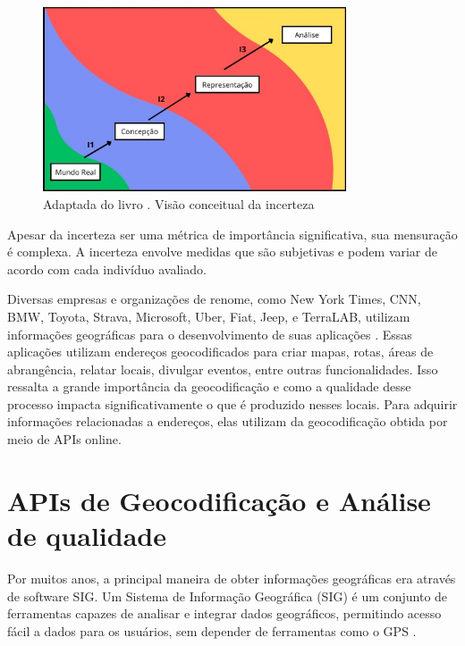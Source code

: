 \begin{figure}[ht]
   \centering
   \includegraphics[width=0.8\textwidth]{Figuras/incertezaMeu.jpeg}
   \caption{Adaptada do livro \cite{longley2013}. Visão conceitual da incerteza}
   \label{fig:incerteza}
\end{figure}

Apesar da incerteza ser uma métrica de importância significativa, sua mensuração é complexa. A incerteza envolve medidas que são subjetivas e podem variar de acordo com cada indivíduo avaliado. 


Diversas empresas e organizações de renome, como New York Times, CNN, BMW, Toyota, Strava, Microsoft, Uber, Fiat, Jeep, e TerraLAB,  utilizam informações geográficas para o desenvolvimento de suas aplicações \cite{ors, terralab, mapbox, tomtom}. Essas aplicações utilizam endereços geocodificados para criar mapas, rotas, áreas de abrangência, relatar locais, divulgar eventos, entre outras funcionalidades. Isso ressalta a grande importância da geocodificação e como a qualidade desse processo impacta significativamente o que é produzido nesses locais. Para adquirir informações relacionadas a endereços, elas utilizam da geocodificação obtida por meio de APIs online.

\section{APIs de Geocodificação e Análise de qualidade}

Por muitos anos, a principal maneira de obter informações geográficas era através de software SIG. Um Sistema de Informação Geográfica (SIG) é um conjunto de ferramentas capazes de analisar e integrar dados geográficos, permitindo acesso fácil a dados para os usuários, sem depender de ferramentas como o GPS \cite{stein2021geoprocessamento}.

